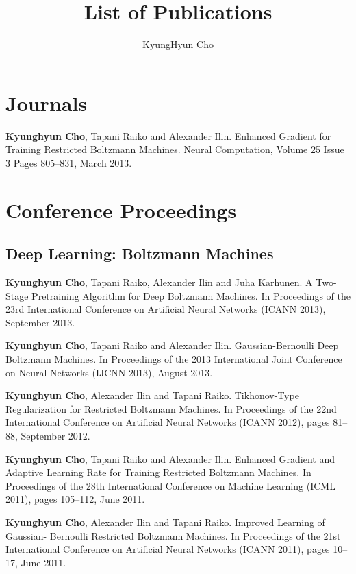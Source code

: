 \documentclass[11pt, oneside]{essay}
\title{List of Publications}
\author{KyungHyun Cho}
\begin{document}
\maketitle

\vspace{5mm}

\section{Journals}

\textbf{Kyunghyun Cho}, Tapani Raiko and Alexander Ilin. Enhanced
Gradient for Training Restricted Boltzmann Machines. Neural
Computation, Volume 25 Issue 3 Pages 805--831, March 2013.

\section{Conference Proceedings}

\subsection{Deep Learning: Boltzmann Machines}

\textbf{Kyunghyun Cho}, Tapani Raiko, Alexander Ilin and Juha
Karhunen. A Two-Stage Pretraining Algorithm for Deep
Boltzmann Machines. In Proceedings of the 23rd International
Conference on Artificial Neural Networks (ICANN 2013),
September 2013.

\textbf{Kyunghyun Cho}, Tapani Raiko and Alexander Ilin.
Gaussian-Bernoulli Deep Boltzmann Machines. In Proceedings
of the 2013 International Joint Conference on Neural
Networks (IJCNN 2013), August 2013.

\textbf{Kyunghyun Cho}, Alexander Ilin and Tapani Raiko.
Tikhonov-Type Regularization for Restricted Boltzmann
Machines. In Proceedings of the 22nd International
Conference on Artificial Neural Networks (ICANN 2012), pages
81--88, September 2012.

\textbf{Kyunghyun Cho}, Tapani Raiko and Alexander Ilin. Enhanced
Gradient and Adaptive Learning Rate for Training
Restricted Boltzmann Machines. In Proceedings of the 28th
International Conference on Machine Learning (ICML 2011),
pages 105--112, June 2011.

\textbf{Kyunghyun Cho}, Alexander Ilin and Tapani Raiko. Improved
Learning of Gaussian- Bernoulli Restricted Boltzmann
Machines. In Proceedings of the 21st International
Conference on Artificial Neural Networks (ICANN 2011), pages
10--17, June 2011.
\end{document}
